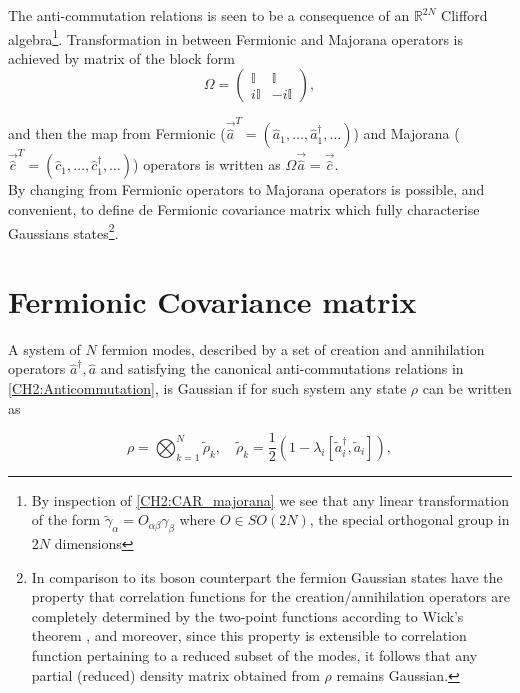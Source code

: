 The anti-commutation relations is seen to be a consequence of an $\mathbb{R}^{2N}$ Clifford algebra\footnote{By inspection of \eqref{CH2:CAR_majorana} we see that  any linear transformation of the form $\tilde{\gamma}_{\alpha} = O_{\alpha\beta}\gamma_{\beta}$ where $O\in SO(2N)$, the special orthogonal group in $2N$  dimensions}. Transformation in between Fermionic and Majorana operators is achieved by matrix of the block form
\begin{equation}
\Omega=\left(\begin{array}{cc}
\mathbb{I} & \mathbb{I} \\
i \mathbb{I} & -i \mathbb{I}
\end{array}\right),
\end{equation}

and then the map from Fermionic ($\vec{\hat{a}}^{T} = (\hat{a}_1,\ldots,\hat{a}_1^{\dagger},\ldots)$) and Majorana ($\vec{\hat{c}}^{T} = (\hat{c}_1,\ldots,\hat{c}_1^{\dagger},\ldots)$) operators is written as $\Omega\vec{\hat{a}}=\vec{\hat{c}}$.
\\
By changing from Fermionic operators to Majorana operators is possible, and convenient, to define de Fermionic covariance matrix which fully characterise Gaussians states\footnote{In comparison to its boson counterpart the fermion Gaussian states have the property that correlation functions for the creation/annihilation operators are completely determined by the two-point functions according to Wick’s theorem \cite{westwanski_general_1973}, and moreover,  since this property is extensible to correlation function pertaining to a reduced subset of the modes, it follows that any partial (reduced) density matrix obtained from $\rho$ remains Gaussian.}.
\section*{Fermionic Covariance matrix }
A system of $N$ fermion modes, described by a set of creation and annihilation operators $\hat{a}^{\dagger}, \hat{a}$  and satisfying the  canonical anti-commutations relations in \eqref{CH2:Anticommutation}, is Gaussian if for such system any state $\rho$ can be written as  \cite{cheong_many-body_2003}

\begin{equation}
\rho=\bigotimes_{k=1}^{N} \tilde{\rho}_{k}, \quad \tilde{\rho}_{k}=\frac{1}{2}\left(1-\lambda_{i}\left[\tilde{a}_{i}^{\dagger}, \tilde{a}_{i}\right]\right),
\label{CH2:rho_gaussiano_no_exp}
\end{equation}

